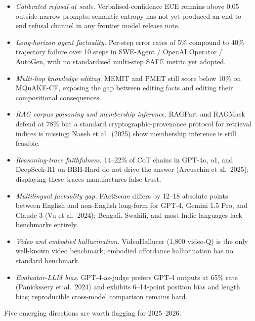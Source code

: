 \begin{itemize}
\tightlist
\item
  \emph{Calibrated refusal at scale.} Verbalised-confidence ECE remains above 0.05 outside narrow prompts; semantic entropy has not yet produced an end-to-end refusal channel in any frontier model release note.
\item
  \emph{Long-horizon agent factuality.} Per-step error rates of 5\% compound to 40\% trajectory failure over 10 steps in SWE-Agent / OpenAI Operator / AutoGen, with no standardised multi-step SAFE metric yet adopted.
\item
  \emph{Multi-hop knowledge editing.} MEMIT and PMET still score below 10\% on MQuAKE-CF, exposing the gap between editing facts and editing their compositional consequences.
\item
  \emph{RAG corpus poisoning and membership inference.} RAGPart and RAGMask defend at 78\% but a standard cryptographic-provenance protocol for retrieval indices is missing; Naseh et al.~(2025) show membership inference is still feasible.
\item
  \emph{Reasoning-trace faithfulness.} 14--22\% of CoT chains in GPT-4o, o1, and DeepSeek-R1 on BBH-Hard do not drive the answer (Arcuschin et al.~2025); displaying these traces manufactures false trust.
\item
  \emph{Multilingual factuality gap.} FActScore differs by 12--18 absolute points between English and non-English long-form for GPT-4, Gemini 1.5 Pro, and Claude 3 (Vu et al.~2024); Bengali, Swahili, and most Indic languages lack benchmarks entirely.
\item
  \emph{Video and embodied hallucination.} VideoHallucer (1,800 video-Q) is the only well-known video benchmark; embodied affordance hallucination has no standard benchmark.
\item
  \emph{Evaluator-LLM bias.} GPT-4-as-judge prefers GPT-4 outputs at 65\% rate (Panickssery et al.~2024) and exhibits 6--14-point position bias and length bias; reproducible cross-model comparison remains hard.
\end{itemize}

Five emerging directions are worth flagging for 2025--2026.

